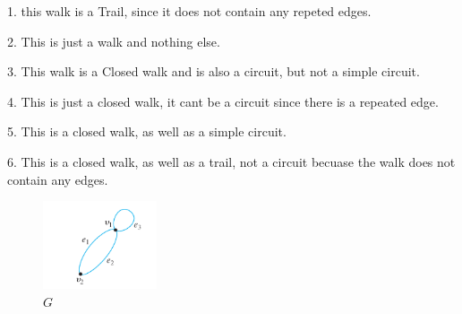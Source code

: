 \documentclass{report}
\begin{document}

1. this walk is a Trail, since it does not contain any repeted edges.
\vspace{2mm}

2. This is just a walk and nothing else.
\vspace{2mm}

3. This walk is a Closed walk and is also a circuit, but not a simple circuit.
\vspace{2mm}

4. This is just a closed walk, it cant be a circuit since there is a repeated edge.
\vspace{2mm}

5. This is a closed walk, as well as a simple circuit.
\vspace{2mm}

6. This is a closed walk, as well as a trail, not a circuit becuase the walk does not contain any edges.
\bigbreak \noindent \bigbreak \noindent
{}
\bigbreak \noindent
{}
\bigbreak \noindent \bigbreak \noindent
{}

\begin{figure}[ht]
\centering
\includegraphics[width=0.3\textwidth]{ figure2.png }
\caption{$G$}
\end{figure}
\newpage
\end{document}

